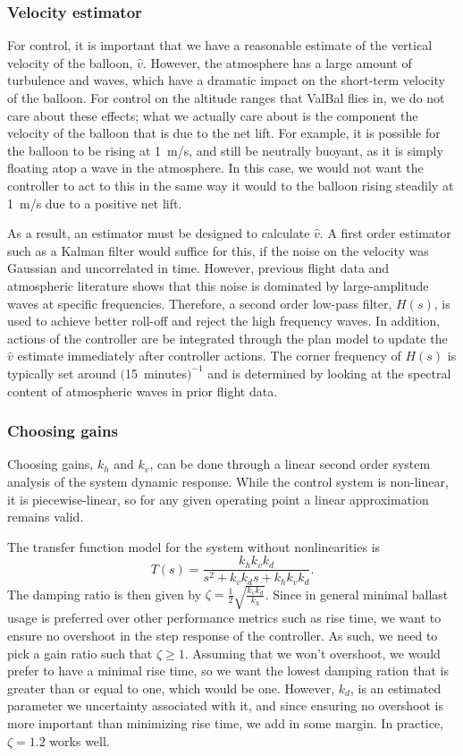 \documentclass[11pt]{scrartcl} %
\begin{document}
\subsubsection{Velocity estimator}

For control, it is important that we have a reasonable estimate of the vertical velocity of the balloon, $\hat v$. However, the atmosphere has a large amount of turbulence and waves, which have a dramatic impact on the short-term velocity of the balloon. For control on the altitude ranges that ValBal flies in, we do not care about these effects; what we actually care about is the component the velocity of the balloon that is due to the net lift. For example, it is possible for the balloon to be rising at 1~m/s, and still be neutrally buoyant, as it is simply floating atop a wave in the atmosphere. In this case, we would not want the controller to act to this in the same way it would to the balloon rising steadily at 1~m/s due to a positive net lift.

As a result, an estimator must be designed to calculate $\hat v$. A first order estimator such as a Kalman filter would suffice for this, if the noise on the velocity was Gaussian and uncorrelated in time. However, previous flight data and atmospheric literature shows that this noise is dominated by large-amplitude waves at specific frequencies. Therefore, a second order low-pass filter, $H(s)$, is used to achieve better roll-off and reject the high frequency waves. In addition, actions of the controller are be integrated through the plan model to update the $\hat v$ estimate immediately after controller actions. The corner frequency of $H(s)$ is typically set around $($15~minutes$)^{-1}$ and is determined by looking at the spectral content of atmospheric waves in prior flight data.

\subsubsection{Choosing gains}

Choosing gains, $k_h$ and $k_v$, can be done through a linear second order system analysis of the system dynamic response. While the control system is non-linear, it is piecewise-linear, so for any given operating point a linear approximation remains valid.

The transfer function model for the system without nonlinearities is 
\[T(s) = \frac{k_h k_v k_d}{s^2 + k_v k_d s + k_h k_v k_d}.\]
The damping ratio is then given by $\zeta = \frac{1}{2}\sqrt{\frac{k_v k_d}{k_h}}$. Since in general minimal ballast usage is preferred over other performance metrics such as rise time, we want to ensure no overshoot in the step response of the controller. As such, we need to pick a gain ratio such that $\zeta \geq 1$. Assuming that we won't overshoot, we would prefer to have a minimal rise time, so we want the lowest damping ration that is greater than or equal to one, which would be one. However, $k_d$, is an estimated parameter we uncertainty associated with it, and since ensuring no overshoot is more important than minimizing rise time, we add in some margin. In practice, $\zeta = 1.2$ works well.
\end{document}
